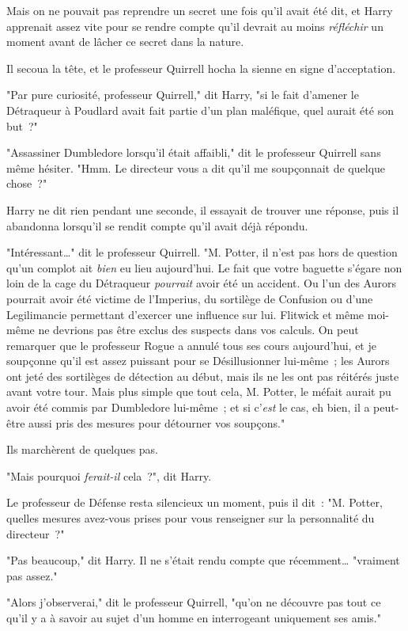 Mais on ne pouvait pas reprendre un secret une fois qu'il avait été dit, et Harry apprenait assez vite pour se rendre compte qu'il devrait au moins \emph{réfléchir} un moment avant de lâcher ce secret dans la nature.

Il secoua la tête, et le professeur Quirrell hocha la sienne en signe d'acceptation.

"Par pure curiosité, professeur Quirrell," dit Harry, "si le fait d'amener le Détraqueur à Poudlard avait fait partie d'un plan maléfique, quel aurait été son but~?"

"Assassiner Dumbledore lorsqu'il était affaibli," dit le professeur Quirrell sans même hésiter. "Hmm. Le directeur vous a dit qu'il me soupçonnait de quelque chose~?"

Harry ne dit rien pendant une seconde, il essayait de trouver une réponse, puis il abandonna lorsqu'il se rendit compte qu'il avait déjà répondu.

"Intéressant…" dit le professeur Quirrell. "M. Potter, il n'est pas hors de question qu'un complot ait \emph{bien} eu lieu aujourd'hui. Le fait que votre baguette s'égare non loin de la cage du Détraqueur \emph{pourrait} avoir été un accident. Ou l'un des Aurors pourrait avoir été victime de l'Imperius, du sortilège de Confusion ou d'une Legilimancie permettant d'exercer une influence sur lui. Flitwick et même moi-même ne devrions pas être exclus des suspects dans vos calculs. On peut remarquer que le professeur Rogue a annulé tous ses cours aujourd'hui, et je soupçonne qu'il est assez puissant pour se Désillusionner lui-même~; les Aurors ont jeté des sortilèges de détection au début, mais ils ne les ont pas réitérés juste avant votre tour. Mais plus simple que tout cela, M. Potter, le méfait aurait pu avoir été commis par Dumbledore lui-même~; et si c'\emph{est} le cas, eh bien, il a peut-être aussi pris des mesures pour détourner vos soupçons."

Ils marchèrent de quelques pas.

"Mais pourquoi \emph{ferait-il} cela~?", dit Harry.

Le professeur de Défense resta silencieux un moment, puis il dit~: "M. Potter, quelles mesures avez-vous prises pour vous renseigner sur la personnalité du directeur~?"

"Pas beaucoup," dit Harry. Il ne s'était rendu compte que récemment… "vraiment pas assez."

"Alors j'observerai," dit le professeur Quirrell, "qu'on ne découvre pas tout ce qu'il y a à savoir au sujet d'un homme en interrogeant uniquement ses amis."

